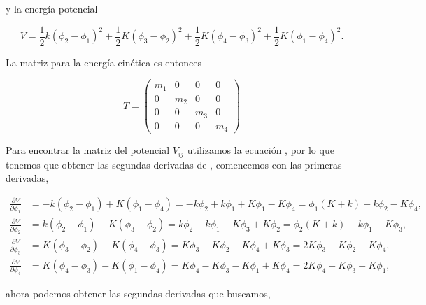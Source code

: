 \documentclass[a4paper,10pt]{article}
\numberwithin{equation}{section}
\begin{document}
y la energía potencial

\begin{equation}
 V = \frac{1}{2}k(\phi_2 - \phi_1)^2 + \frac{1}{2}K(\phi_3 - \phi_2)^2
 + \frac{1}{2}K(\phi_4 - \phi_3)^2 + \frac{1}{2}K(\phi_1 - \phi_4)^2.
 \label{eq:energPotenCirc}
\end{equation}

La matriz para la energía cinética es entonces

\begin{equation}
 T = \begin{pmatrix}
      m_1 & 0 & 0 & 0 \\
      0 & m_2 & 0 & 0 \\
      0 & 0 & m_3 & 0 \\
      0 & 0 & 0 & m_4
     \end{pmatrix}
\end{equation}

Para encontrar la matriz del potencial $V_{ij}$ utilizamos la ecuación ,
por lo que tenemos que obtener las segundas derivadas de , comencemos 
con las primeras derivadas,

\begin{align*}
 \frac{\partial V}{\partial \phi_1} &= -k(\phi_2 - \phi_1) + K(\phi_1 - \phi_4) 
 = -k\phi_2 + k\phi_1 + K\phi_1 - K\phi_4 = \phi_1(K + k) -k\phi_2 - K\phi_4, \\
 \frac{\partial V}{\partial \phi_2} &= k(\phi_2 - \phi_1)  - K(\phi_3 - \phi_2)
 = k\phi_2 - k\phi_1 - K\phi_3 + K\phi_2 = \phi_2(K+k) - k\phi_1 - K\phi_3, \\
 \frac{\partial V}{\partial \phi_3} &= K(\phi_3 - \phi_2) - K(\phi_4 - \phi_3)
 = K\phi_3 - K\phi_2 - K\phi_4 + K\phi_3 = 2K\phi_3 - K\phi_2 - K\phi_4, \\
 \frac{\partial V}{\partial \phi_4} &=  K(\phi_4 - \phi_3) - K(\phi_1 - \phi_4)
 = K\phi_4 - K\phi_3 - K\phi_1 + K\phi_4 = 2K\phi_4 - K\phi_3 - K\phi_1 ,
\end{align*}

ahora podemos obtener las segundas derivadas que buscamos,
\end{document}
